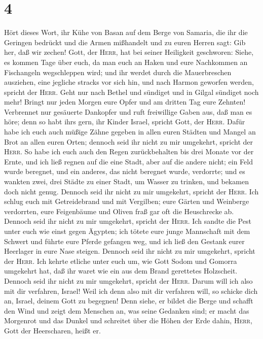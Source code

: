 \hypertarget{section-3}{%
\section{4}\label{section-3}}

 Hört dieses Wort, ihr Kühe von Basan auf dem Berge von
Samaria, die ihr die Geringen bedrückt und die Armen mißhandelt und zu
euren Herren sagt: Gib her, daß wir zechen!  Gott, der
\textsc{Herr}, hat bei seiner Heiligkeit geschworen: Siehe, es kommen
Tage über euch, da man euch an Haken und eure Nachkommen an Fischangeln
wegschleppen wird;  und ihr werdet durch die Mauerbreschen
ausziehen, eine jegliche stracks vor sich hin, und nach Harmon geworfen
werden, spricht der \textsc{Herr}.  Geht nur nach Bethel
und sündiget und in Gilgal sündiget noch mehr! Bringt nur jeden Morgen
eure Opfer und am dritten Tag eure Zehnten!  Verbrennet
nur gesäuerte Dankopfer und ruft freiwillige Gaben aus, daß man es höre;
denn so habt ihr\textquotesingle s gern, ihr Kinder Israel, spricht
Gott, der \textsc{Herr}.  Dafür habe ich euch auch müßige
Zähne gegeben in allen euren Städten und Mangel an Brot an allen euren
Orten; dennoch seid ihr nicht zu mir umgekehrt, spricht der
\textsc{Herr}.  So habe ich euch auch den Regen
zurückbehalten bis drei Monate vor der Ernte, und ich ließ regnen auf
die eine Stadt, aber auf die andere nicht; ein Feld wurde beregnet, und
ein anderes, das nicht beregnet wurde, verdorrte;  und es
wankten zwei, drei Städte zu einer Stadt, um Wasser zu trinken, und
bekamen doch nicht genug. Dennoch seid ihr nicht zu mir umgekehrt,
spricht der \textsc{Herr}.  Ich schlug euch mit
Getreidebrand und mit Vergilben; eure Gärten und Weinberge verdorrten,
eure Feigenbäume und Oliven fraß gar oft die Heuschrecke ab. Dennoch
seid ihr nicht zu mir umgekehrt, spricht der \textsc{Herr}.
 Ich sandte die Pest unter euch wie einst gegen Ägypten;
ich tötete eure junge Mannschaft mit dem Schwert und führte eure Pferde
gefangen weg, und ich ließ den Gestank eurer Heerlager in eure Nase
steigen. Dennoch seid ihr nicht zu mir umgekehrt, spricht der
\textsc{Herr}.  Ich kehrte etliche unter euch um, wie
Gott Sodom und Gomorra umgekehrt hat, daß ihr waret wie ein aus dem
Brand gerettetes Holzscheit. Dennoch seid ihr nicht zu mir umgekehrt,
spricht der \textsc{Herr}.  Darum will ich also mit dir
verfahren, Israel! Weil ich denn also mit dir verfahren will, so schicke
dich an, Israel, deinem Gott zu begegnen!  Denn siehe, er
bildet die Berge und schafft den Wind und zeigt dem Menschen an, was
seine Gedanken sind; er macht das Morgenrot und das Dunkel und schreitet
über die Höhen der Erde dahin, \textsc{Herr}, Gott der Heerscharen,
heißt er.

